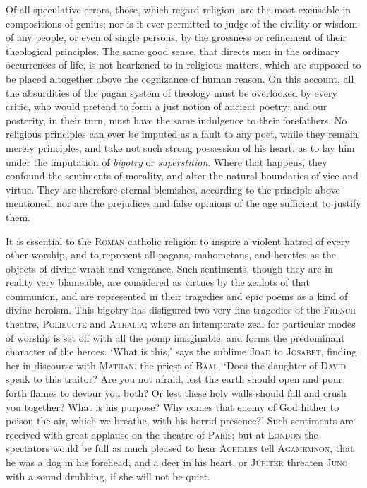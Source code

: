 Of all speculative errors, those, which regard religion, are the most
excusable in compositions of genius; nor is it ever permitted to judge
of the civility or wisdom of any people, or even of single persons, by
the grossness or refinement of their theological principles. The same
good sense, that directs men in the ordinary occurrences of life, is
not hearkened to in religious matters, which are supposed to be placed
altogether above the cognizance of human reason. On this account, all
the absurdities of the pagan system of theology must be overlooked by
every critic, who would pretend to form a just notion of ancient
poetry; and our posterity, in their turn, must have the same
indulgence to their forefathers. No religious principles can ever be
imputed as a fault to any poet, while they remain merely principles,
and take not such strong possession of his heart, as to lay him under
the imputation of \textit{bigotry} or \textit{superstition}. Where
that happens, they confound the sentiments of morality, and alter
 the natural boundaries of vice and virtue. They are
therefore eternal blemishes, according to the principle above
mentioned; nor are the prejudices and false opinions of the age
sufficient to justify them.

It is essential to the \textsc{Roman} catholic religion to inspire a
violent hatred of every other worship, and to represent all pagans,
mahometans, and heretics as the objects of divine wrath and vengeance.
Such sentiments, though they are in reality very blameable, are
considered as virtues by the zealots of that communion, and are
represented in their tragedies and epic poems as a kind of divine
heroism. This bigotry has disfigured two very fine tragedies of the
\textsc{French} theatre, \textsc{Polieucte} and \textsc{Athalia};
where an intemperate zeal for particular modes of worship is set off
with all the pomp imaginable, and forms the predominant character of
the heroes. `What is this,' says the sublime \textsc{Joad} to
\textsc{Josabet}, finding her in discourse with \textsc{Mathan}, the
priest of \textsc{Baal}, `Does the daughter of \textsc{David} speak to
this traitor? Are you not afraid, lest the earth should open and pour
forth flames to devour you both? Or lest these holy walls should fall
and crush you together? What is his purpose? Why comes that enemy of
God hither to poison the air, which we breathe, with his horrid
presence?' Such sentiments are received with great applause on the
theatre of \textsc{Paris}; but at \textsc{London} the spectators would
be full as much pleased to hear \textsc{Achilles} tell
\textsc{Agamemnon}, that he was a dog in his forehead, and a deer in
his heart, or \textsc{Jupiter} threaten \textsc{Juno} with a sound
drubbing, if she will not be quiet.

